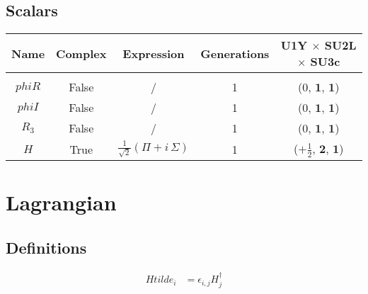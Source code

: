 \documentclass[12pt]{article}
\begin{document}
\subsection{Scalars}

\begin{table}[h]
\renewcommand{\arraystretch}{1.15}
\centering
\begin{tabular}{c@{\hskip .66cm}c@{\hskip .66cm}ccc}
\hline
Name & Complex & Expression & Generations & U1Y $\times$ SU2L $\times$ SU3c\\ \hline \\ [-2ex]
$phiR$ & False & / & 1 & ($0$, $\mathbf{1}$, $\mathbf{1}$) \\[.2cm]
$phiI$ & False & / & 1 & ($0$, $\mathbf{1}$, $\mathbf{1}$) \\[.2cm]
$R_{3}$ & False & / & 1 & ($0$, $\mathbf{1}$, $\mathbf{1}$) \\[.2cm]
$H$ & True & $\frac{1}{\sqrt{2}} \left(\Pi + i\, \Sigma\right)$ & 1 & ($+\frac{1}{2}$, $\mathbf{2}$, $\mathbf{1}$) \\[.1cm] \hline
\end{tabular}
\end{table}

\section{Lagrangian}

\subsection{Definitions}
{\allowdisplaybreaks
\begin{align*}
Htilde{}_{i} &= \epsilon_{i,j} H^{\dagger}_{j}\\
\end{align*}
}
\end{document}
